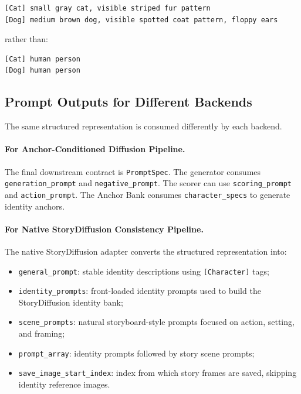 \documentclass[11pt,a4paper]{article}
\newcommand{\pipelineA}{Anchor-Conditioned Diffusion Pipeline}
\newcommand{\pipelineB}{Native StoryDiffusion Consistency Pipeline}
\begin{document}
\begin{lstlisting}
[Cat] small gray cat, visible striped fur pattern
[Dog] medium brown dog, visible spotted coat pattern, floppy ears
\end{lstlisting}

rather than:

\begin{lstlisting}
[Cat] human person
[Dog] human person
\end{lstlisting}

\subsection{Prompt Outputs for Different Backends}

The same structured representation is consumed differently by each backend.

\paragraph{For \pipelineA.}
The final downstream contract is \texttt{PromptSpec}. The generator consumes \texttt{generation\_prompt} and \texttt{negative\_prompt}. The scorer can use \texttt{scoring\_prompt} and \texttt{action\_prompt}. The Anchor Bank consumes \texttt{character\_specs} to generate identity anchors.

\paragraph{For \pipelineB.}
The native StoryDiffusion adapter converts the structured representation into:

\begin{itemize}[leftmargin=*]
    \item \texttt{general\_prompt}: stable identity descriptions using \texttt{[Character]} tags;
    \item \texttt{identity\_prompts}: front-loaded identity prompts used to build the StoryDiffusion identity bank;
    \item \texttt{scene\_prompts}: natural storyboard-style prompts focused on action, setting, and framing;
    \item \texttt{prompt\_array}: identity prompts followed by story scene prompts;
    \item \texttt{save\_image\_start\_index}: index from which story frames are saved, skipping identity reference images.
\end{itemize}
\end{document}
